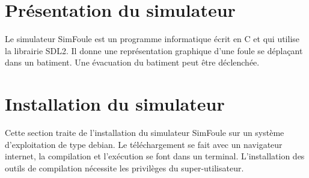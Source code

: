 
%

\section{Présentation du simulateur}
%
Le simulateur SimFoule est un programme informatique écrit en C et qui utilise la librairie SDL2. Il donne une représentation graphique d'une foule se déplaçant dans un batiment. Une évacuation du batiment peut être déclenchée.
%
%
\section{Installation du simulateur}
Cette section traite de l'installation du simulateur SimFoule sur un système d'exploitation de type debian. Le téléchargement se fait avec un navigateur internet, la compilation et l'exécution se font dans un terminal. L'installation des outils de compilation nécessite les privilèges du super-utilisateur.
